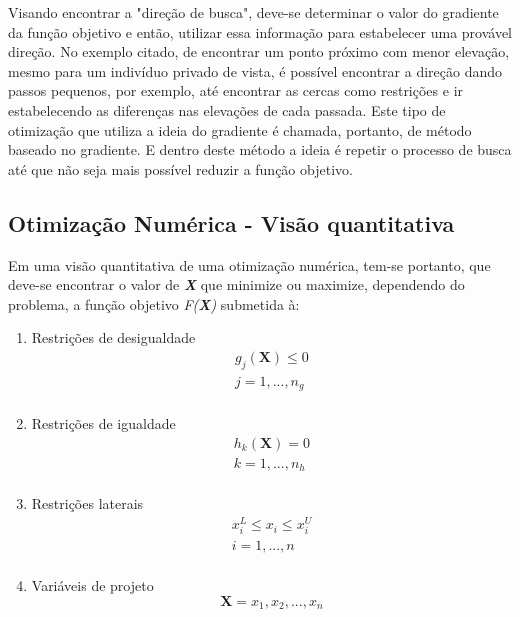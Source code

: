 Visando encontrar a "direção de busca", deve-se determinar o valor do gradiente da função objetivo e então, utilizar essa informação para estabelecer uma provável direção. No exemplo citado, de encontrar um ponto próximo com menor elevação, mesmo para um indivíduo privado de vista, é possível encontrar a direção dando passos pequenos, por exemplo, até encontrar as cercas como restrições e ir estabelecendo as diferenças nas elevações de cada passada. Este tipo de otimização que utiliza a ideia do gradiente é chamada, portanto, de método baseado no gradiente. E dentro deste método a ideia é repetir o processo de busca até que não seja mais possível reduzir a função objetivo.

\subsection{Otimização Numérica - Visão quantitativa}
Em uma visão quantitativa de uma otimização numérica, tem-se portanto, que deve-se encontrar o valor de \emph{\textbf{X}} que minimize ou maximize, dependendo do problema, a função objetivo \emph{F(\textbf{X})} submetida à:

\begin{enumerate}
\item Restrições de desigualdade
\begin{equation} \label{otimization_1}
\begin{split}
g_{j}(\textbf{X})\leq0 \\
j = 1, ..., n_{g}\\
\end{split}
\end{equation}
\item Restrições de igualdade
\begin{equation} \label{otimization_2}
\begin{split}
h_{k}(\textbf{X})=0 \\
k = 1, ..., n_{h}\\
\end{split}
\end{equation}
\item Restrições laterais
\begin{equation} \label{otimization_3}
\begin{split}
x_{i}^L \leq x_{i}\leq x_{i}^U  \\
i = 1, ..., n\\
\end{split}
\end{equation}
\item Variáveis de projeto
\begin{equation} \label{otimization_4}
\textbf{X} = {x_{1}, x_{2}, ..., x_{n}}
\end{equation}

\end {enumerate}

